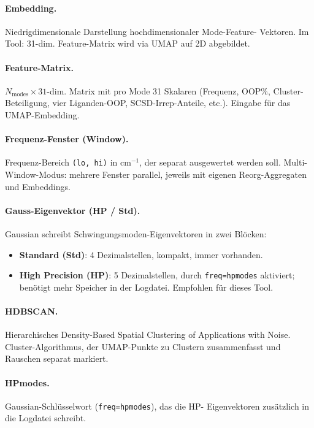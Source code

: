 \documentclass[11pt,a4paper,twoside]{article}
\theoremstyle{remark}
\begin{document}
\paragraph{Embedding.}
Niedrigdimensionale Darstellung hochdimensionaler Mode-Feature-
Vektoren. Im Tool: 31-dim. Feature-Matrix wird via UMAP auf 2D
abgebildet.

\paragraph{Feature-Matrix.}
$N_\text{modes} \times 31$-dim. Matrix mit pro Mode 31 Skalaren
(Frequenz, OOP\%, Cluster-Beteiligung, vier Liganden-OOP,
SCSD-Irrep-Anteile, etc.). Eingabe f\"ur das UMAP-Embedding.

\paragraph{Frequenz-Fenster (Window).}
Frequenz-Bereich \texttt{(lo, hi)} in cm$^{-1}$, der separat
ausgewertet werden soll. Multi-Window-Modus: mehrere Fenster
parallel, jeweils mit eigenen Reorg-Aggregaten und
Embeddings.

\paragraph{Gauss-Eigenvektor (HP / Std).}
Gaussian schreibt Schwingungsmoden-Eigenvektoren in zwei Bl\"ocken:
\begin{itemize}\setlength{\itemsep}{0pt}
  \item \textbf{Standard (Std)}: 4 Dezimalstellen, kompakt, immer
        vorhanden.
  \item \textbf{High Precision (HP)}: 5 Dezimalstellen, durch
        \texttt{freq=hpmodes} aktiviert; ben\"otigt mehr Speicher
        in der Logdatei. Empfohlen f\"ur dieses Tool.
\end{itemize}

\paragraph{HDBSCAN.}
Hierarchisches Density-Based Spatial Clustering of Applications
with Noise. Cluster-Algorithmus, der UMAP-Punkte zu Clustern
zusammenfasst und Rauschen separat markiert.

\paragraph{HPmodes.}
Gaussian-Schl\"usselwort (\texttt{freq=hpmodes}), das die HP-
Eigenvektoren zus\"atzlich in die Logdatei schreibt.
\end{document}
